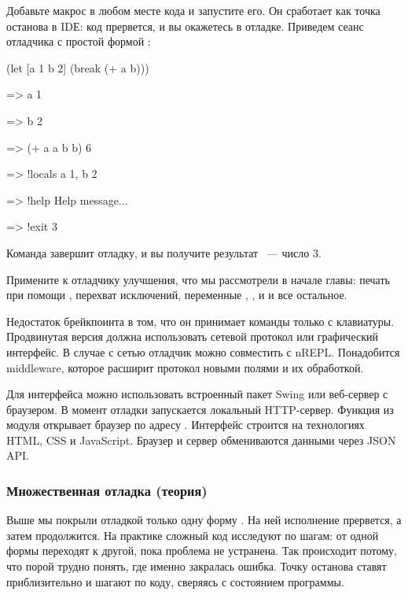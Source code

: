 Добавьте макрос  в любом месте кода и запустите его. Он сработает как точка останова в IDЕ: код прервется, и вы окажетесь в отладке. Приведем сеанс отладчика с простой формой :

\begin{english}
  \begin{clojure}
(let [a 1 b 2]
  (break (+ a b)))

=> a
1

=> b
2

=> (+ a a b b)
6

=> !locals
{a 1, b 2}

=> !help
Help message...

=> !exit
3
  \end{clojure}
\end{english}

Команда  завершит отладку, и вы получите результат ~--- число 3.

Примените к отладчику улучшения, что мы рассмотрели в начале главы: печать при помощи , перехват исключений, переменные , ,  и  и все остальное.

Недостаток брейкпоинта в том, что он принимает команды только с клавиатуры. Продвинутая версия должна использовать сетевой протокол или графический интерфейс. В случае с сетью отладчик можно совместить с nREPL. Понадобится middleware, которое расширит протокол новыми полями и их обработкой.

Для интерфейса можно использовать встроенный пакет Swing или веб-сервер с браузером. В момент отладки запускается локальный HTTP-сервер. Функция  из модуля  открывает браузер по адресу . Интерфейс строится на технологиях HTML, CSS и JavaScript. Браузер и сервер обмениваются данными через JSON API.

\subsubsection{Множественная отладка (теория)}

Выше мы покрыли отладкой только одну форму . На ней исполнение прервется, а затем продолжится. На практике сложный код исследуют по шагам: от одной формы переходят к другой, пока проблема не устранена. Так происходит потому, что порой трудно понять, где именно закралась ошибка. Точку останова ставят приблизительно и шагают по коду, сверяясь с состоянием программы.

